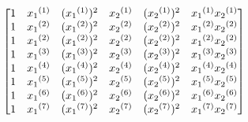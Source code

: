 \documentclass[preview]{standalone}
\begin{document}
\begin{align*}
\special{dvisvgm:raw <g id='unique000'>}\begin{bmatrix}1&{x_{1}}^{(1)}&({x_{1}}^{(1)})^2&{x_{2}}^{(1)}&({x_{2}}^{(1)})^2&{x_{1}}^{(1)}{x_{2}}^{(1)}\\1&{x_{1}}^{(2)}&({x_{1}}^{(2)})^2&{x_{2}}^{(2)}&({x_{2}}^{(2)})^2&{x_{1}}^{(2)}{x_{2}}^{(2)}\\1&{x_{1}}^{(2)}&({x_{1}}^{(2)})^2&{x_{2}}^{(2)}&({x_{2}}^{(2)})^2&{x_{1}}^{(2)}{x_{2}}^{(2)}\\1&{x_{1}}^{(3)}&({x_{1}}^{(3)})^2&{x_{2}}^{(3)}&({x_{2}}^{(3)})^2&{x_{1}}^{(3)}{x_{2}}^{(3)}\\1&{x_{1}}^{(4)}&({x_{1}}^{(4)})^2&{x_{2}}^{(4)}&({x_{2}}^{(4)})^2&{x_{1}}^{(4)}{x_{2}}^{(4)}\\1&{x_{1}}^{(5)}&({x_{1}}^{(5)})^2&{x_{2}}^{(5)}&({x_{2}}^{(5)})^2&{x_{1}}^{(5)}{x_{2}}^{(5)}\\1&{x_{1}}^{(6)}&({x_{1}}^{(6)})^2&{x_{2}}^{(6)}&({x_{2}}^{(6)})^2&{x_{1}}^{(6)}{x_{2}}^{(6)}\\1&{x_{1}}^{(7)}&({x_{1}}^{(7)})^2&{x_{2}}^{(7)}&({x_{2}}^{(7)})^2&{x_{1}}^{(7)}{x_{2}}^{(7)}\end{bmatrix}\special{dvisvgm:raw </g>}
\end{align*}
\end{document}
